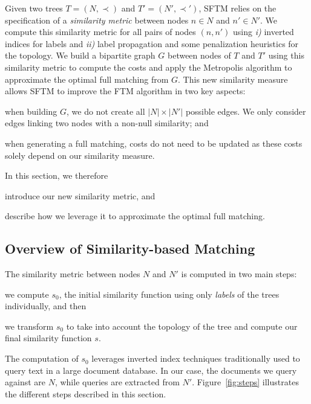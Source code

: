 Given two trees $T=(N,\prec)$ and $T'=(N',\prec')$, SFTM relies on the specification of a \textit{similarity metric} between nodes $n \in N$ and $n' \in N'$.
We compute this similarity metric for all pairs of nodes $(n,n')$ using \emph{i)} inverted indices for labels and \emph{ii)} label propagation and some penalization heuristics for the topology.
We build a bipartite graph $G$ between nodes of $T$ and $T'$ using this similarity metric to compute the costs and apply the Metropolis algorithm to approximate the optimal full matching from $G$.
This new similarity measure allows SFTM to improve the FTM algorithm in two key aspects:
\begin{compactenum}
	\item when building $G$, we do not create all $|N|\times|N'|$ possible edges. We only consider edges linking two nodes with a non-null similarity; and
    \item when generating a full matching, costs do not need to be updated as these costs solely depend on our similarity measure.
\end{compactenum}
In this section, we therefore
\begin{inparaenum}[(a)]
	\item introduce our new similarity metric, and
    \item describe how we leverage it to approximate the optimal full matching.
\end{inparaenum}

\subsection{Overview of Similarity-based Matching}\label{se:newCost}
The similarity metric between nodes $N$ and $N'$ is computed in two main steps:
\begin{inparaenum}
	\item we compute $s_0$, the initial similarity function using only \textit{labels} of the trees individually, and then
    \item we transform $s_0$ to take into account the topology of the tree and compute our final similarity function $s$.
\end{inparaenum}
The computation of $s_0$ leverages inverted index techniques traditionally used to query text in a large document database.
In our case, the documents we query against are $N$, while queries are extracted from $N'$.
Figure~\ref{fig:steps} illustrates the different steps described in this section.


